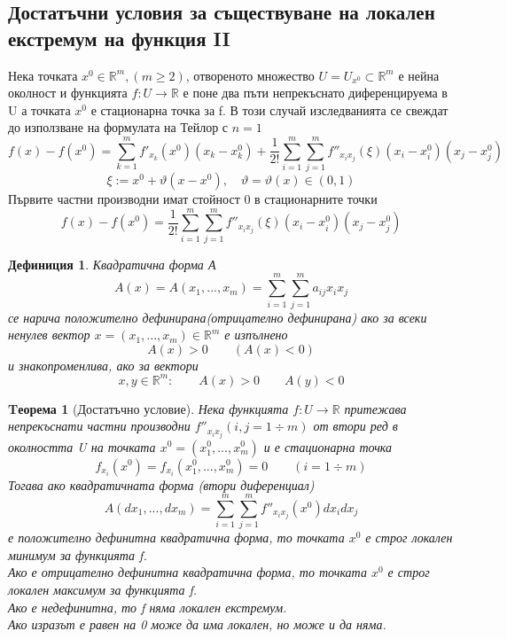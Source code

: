 \documentclass[a4paper,fleqn,12pt]{article}
\newtheorem{theorem}{Tеорема}[subsection]
\newtheorem{definition}{Дефиниция}[subsection]
\theoremstyle{definition}
\begin{document}
\subsection{Достатъчни условия за съществуване на локален екстремум на функция II}
Нека точката $x^0 \in \mathbb{R}^m, (m \geq 2)$, отвореното множество $U = U_{x^0} \subset \mathbb{R}^m$ е нейна околност и функцията $f: U \to \mathbb{R}$ е поне два пъти непрекъснато диференцируема в U а точката $x^0$ е стационарна точка за f. В този случай изследванията се свеждат до използване на формулата на Тейлор с $n = 1$
$$f(x) - f(x^0) = \sum_{k=1} ^m f'_{x_k}(x^0)(x_k - x_k ^0) + \dfrac{1}{2!} \sum_{i=1} ^m \sum_{j=1} ^m f''_{x_i x_j}(\xi)(x_i - x_i ^0)(x_j - x_j ^0)$$
$$\xi := x^0 + \vartheta (x - x^0), \quad \vartheta = \vartheta(x) \in (0,1)$$
Първите частни производни имат стойност 0 в стационарните точки
$$f(x) - f(x^0) = \dfrac{1}{2!} \sum_{i=1} ^m \sum_{j=1} ^m f''_{x_i x_j}(\xi)(x_i - x_i ^0)(x_j - x_j ^0)$$ 
\begin{definition}
Квадратична форма А
$$A(x) = A(x_1, ..., x_m) = \sum_{i=1} ^m \sum_{j=1} ^m a_{ij} x_i x_j$$
се нарича положително дефинирана(отрицателно дефинирана) ако за всеки ненулев вектор $x = (x_1, ..., x_m) \in \mathbb{R}^m$ е изпълнено $$A(x) >0 \qquad (A(x) < 0)$$ и знакопроменлива, ако за вектори $$x,y \in \mathbb{R}^m: \qquad A(x) >0 \qquad A(y) < 0$$
\end{definition}

\begin{theorem}[Достатъчно условие]
Нека функцията $f: U \to \mathbb{R}$ притежава непрекъснати частни производни $f''_{x_i x_j} (i,j = 1 \div m)$ от втори ред в околността U на точката $x^0 = (x_1 ^0, ..., x_m ^0)$ и е стационарна точка 
$$f_{x_i}(x^0) = f_{x_i}(x_1 ^0, ..., x_m ^0) = 0 \qquad (i = 1 \div m)$$
Тогава ако квадратичната форма (втори диференциал)
$$A(dx_1, ..., dx_m) = \sum_{i=1} ^m \sum_{j=1} ^m f''_{x_i x_j}(x^0)dx_i dx_j$$
е положително дефинитна квадратична форма, то точката $x^0$ е строг локален минимум за функцията f. \\
Ако е отрицателно дефинитна квадратична форма, то точката $x^0$ е строг локален максимум за функцията f. \\
Ако е недефинитна, то f няма локален екстремум. \\
Ако изразът е равен на 0 може да има локален, но може и да няма.
\end{theorem}
\end{document}

